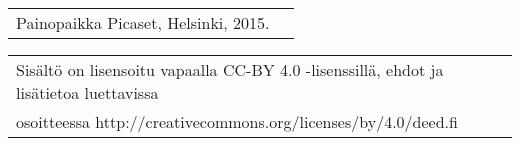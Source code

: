 \begin{tabular}{l l}
Painopaikka Picaset, Helsinki, 2015.&\\
\end{tabular}

\begin{tabular}{l l}
Sisältö on lisensoitu vapaalla CC-BY 4.0 -lisenssillä, ehdot ja lisätietoa luettavissa&\\ osoitteessa http://creativecommons.org/licenses/by/4.0/deed.fi
\end{tabular}

